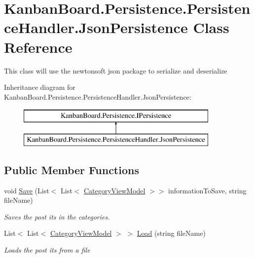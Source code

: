 \hypertarget{class_kanban_board_1_1_persistence_1_1_persistence_handler_1_1_json_persistence}{}\section{Kanban\+Board.\+Persistence.\+Persistence\+Handler.\+Json\+Persistence Class Reference}
\label{class_kanban_board_1_1_persistence_1_1_persistence_handler_1_1_json_persistence}


This class will use the newtonsoft json package to serialize and deserialize  


Inheritance diagram for Kanban\+Board.\+Persistence.\+Persistence\+Handler.\+Json\+Persistence\+:\begin{figure}[H]
\begin{center}
\leavevmode
\includegraphics[height=2.000000cm]{class_kanban_board_1_1_persistence_1_1_persistence_handler_1_1_json_persistence}
\end{center}
\end{figure}
\subsection*{Public Member Functions}
\begin{DoxyCompactItemize}
\item 
void \hyperlink{class_kanban_board_1_1_persistence_1_1_persistence_handler_1_1_json_persistence_af52abfa1b88d8c2066b202e1463469cf}{Save} (List$<$ List$<$ \hyperlink{class_kanban_board_1_1_view_model_1_1_category_view_model}{Category\+View\+Model} $>$$>$ information\+To\+Save, string file\+Name)
\begin{DoxyCompactList}\small\item\em Saves the post its in the categories. \end{DoxyCompactList}\item 
List$<$ List$<$ \hyperlink{class_kanban_board_1_1_view_model_1_1_category_view_model}{Category\+View\+Model} $>$ $>$ \hyperlink{class_kanban_board_1_1_persistence_1_1_persistence_handler_1_1_json_persistence_a0c9c4ad5ccdac78bb3083850f45d691b}{Load} (string file\+Name)
\begin{DoxyCompactList}\small\item\em Loads the post its from a file \end{DoxyCompactList}\end{DoxyCompactItemize}


